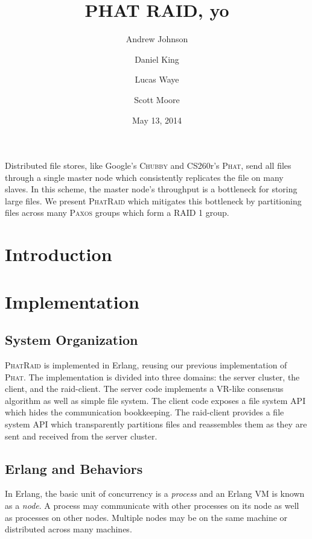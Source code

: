 \documentclass[10pt,letter]{article}
\newcommand{\chubby}[0]{\textsc{Chubby}}
\newcommand{\phat}[0]{\textsc{Phat}}
\newcommand{\phatraid}[0]{\textsc{PhatRaid}}
\newcommand{\raid}[1]{\textsc{RAID #1}}
\newcommand{\paxos}[0]{\textsc{Paxos}}
\begin{document}
\title{PHAT RAID, yo}
\author{Andrew Johnson \and Daniel King \and Lucas Waye \and Scott Moore}
\date{May 13, 2014}

\maketitle

Distributed file stores, like Google's \chubby{} and CS260r's \phat{}, send all
files through a single master node which consistently replicates the file on
many slaves. In this scheme, the master node's throughput is a bottleneck for
storing large files. We present \phatraid{} which mitigates this bottleneck by
partitioning files across many \paxos{} groups which form a \raid{1} group.

\section{Introduction}

\section{Implementation}

\subsection{System Organization}

\phatraid{} is implemented in Erlang, reusing our previous implementation of
\phat{}. The implementation is divided into three domains: the server cluster,
the client, and the raid-client. The server code implements a VR-like consensus
algorithm as well as simple file system. The client code exposes a file system
API which hides the communication bookkeeping. The raid-client provides a file
system API which transparently partitions files and reassembles them as they are
sent and received from the server cluster.



\subsection{Erlang and Behaviors}

In Erlang, the basic unit of concurrency is a \emph{process} and an Erlang VM is
known as a \emph{node}. A process may communicate with other processes on its
node as well as processes on other nodes. Multiple nodes may be on the same
machine or distributed across many machines.
\end{document}
